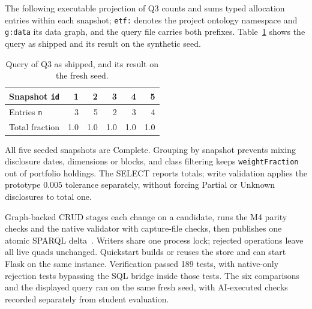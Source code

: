 The following executable projection of Q3 counts and sums typed allocation entries
within each snapshot; \texttt{etf:} denotes the project ontology namespace and
\texttt{g:data} its data graph, and the query file carries both prefixes.
Table~\ref{tab:q3} shows the query as shipped and its result on the synthetic seed.
\begin{table}[t]
\centering
\caption{Query of Q3 as shipped, and its result on the fresh seed.}
\label{tab:q3}

\footnotesize
\begin{tabular}{@{}lrrrrr@{}}
\toprule
Snapshot \texttt{id} & 1 & 2 & 3 & 4 & 5 \\
\midrule
Entries \texttt{n} & 3 & 5 & 2 & 3 & 4 \\
Total fraction & 1.0 & 1.0 & 1.0 & 1.0 & 1.0 \\
\bottomrule
\end{tabular}
\end{table}
All five seeded snapshots are Complete. Grouping by snapshot prevents mixing
disclosure dates, dimensions or blocks, and class filtering keeps
\texttt{weightFraction} out of portfolio holdings. The SELECT reports totals; write
validation applies the prototype $0.005$ tolerance separately, without forcing
Partial or Unknown disclosures to total one.

Graph-backed CRUD stages each change on a candidate, runs the M4 parity checks and
the native validator with capture-file checks, then publishes one atomic SPARQL
delta~\cite{sparqlUpdate}. Writers share one process lock; rejected
operations leave all live quads unchanged. Quickstart builds or reuses the store
and can start Flask on the same instance. Verification passed 189 tests, with
native-only rejection tests bypassing the SQL bridge inside those tests. The six comparisons and the displayed query ran on the same fresh seed, with
AI-executed checks recorded separately from student evaluation.
